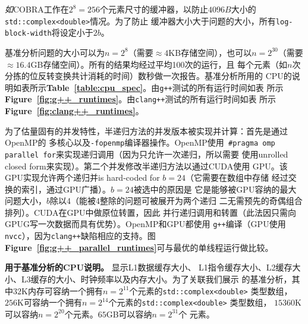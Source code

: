 \documentclass[10pt]{article}
\begin{document}
\begin{CJK*}{UTF8}{gbsn}
\emph{如}COBRA工作在$2^8 = 256$个元素尺寸的缓冲器，以防止$4096B$大小的
{\tt std::complex<double>}情况。为了防止
缓冲器大小大于问题的大小，所有{\tt log-block-width}将设定小于$2b$。

基准分析问题的大小可以为$n = 2^8$（需要$\approx 4$KB存储空间），也可以$n =
2^{30}$（需要$\approx 16.4$GB存储空间）。所有的结果均经过平均100次的运行，且
每个元素（如$n$次分拣的位反转变换共计消耗的时间）数秒做一次报告。基准分析所用的
CPU的说明如表所示{\bf Table~\ref{table:cpu_spec}}。由{\tt g++}测试的所有运行时间如表
所示{\bf Figure~\ref{fig:g++_runtimes}}。由{\tt clang++}测试的所有运行时间如表
所示{\bf Figure~\ref{fig:clang++_runtimes}}。

为了估量固有的并发特性，半递归方法的并发版本被实现并计算：首先是通过OpenMP的
多核心以及{\tt -fopenmp}编译器操作。OpenMP使用{\tt
\#pragma omp parallel for}来实现递归调用（因为只允许一次递归，所以需要
使用unrolled closed form来实现）。第二个并发修改半递归方法以通过CUDA使用
GPU。该GPU实现允许两个递归并is hard-coded for $b=24$（它需要在数组中存储
经过交换的索引，通过GPU广播）。$b=24$被选中的原因是
它是能够被GPU容纳的最大问题大小，$b$除以4（能被4整除的问题可被展开为两个递归
二无需预先的奇偶组合排列）。CUDA在GPU中做原位转置\cite{harris:cuda}，因此
并行递归调用和转置（此法因只需向GPUG写一次数据而具有优势）。OpenMP和GPU都使用
{\tt g++}编译（GPU使用{\tt nvcc}），因为{\tt clang++}缺陷相应的支持。图{\bf
  Figure~\ref{fig:g++_parallel_runtimes}}可与最优的单线程运行做比较。

\begin{table}[ht!]
  \centering
  
\caption{ {\bf 用于基准分析的CPU说明。} 显示L1数据缓存大小、
  L1指令缓存大小、L2缓存大小、L3缓存的大小、时钟频率以及内存大小。为了关联我们展示
  的基准分析，其中$32$K内存可容纳一个拥有$n=2^{11}$个元素的{\tt std::complex<double>}
  类型数组，$256$K可容纳一个拥有$n=2^{14}$个元素的{\tt std::complex<double>}
  类型数组， $15360$K可以容纳$n=2^{20}$个元素。$65$GB可以容纳$n=2^{31}$个
  元素。
  \label{table:cpu_spec}
}
\end{table}


\end{CJK*}
\end{document}
